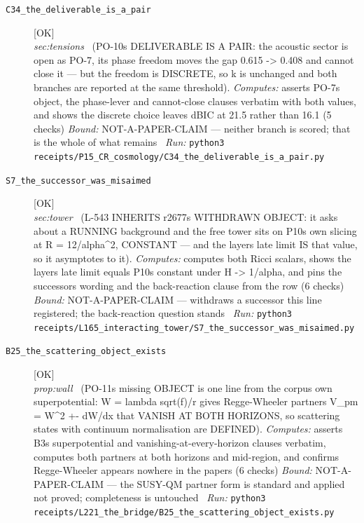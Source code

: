 \begin{description}
\item[\label{rcpt:C34_the_deliverable_is_a_pair}\texttt{C34\_the\_deliverable\_is\_a\_pair}]\hfill\textsf{[OK]}\\
\textit{sec:tensions} \ (PO-10s DELIVERABLE IS A PAIR: the acoustic sector is open as PO-7, its phase freedom moves the gap 0.615 -> 0.408 and cannot close it --- but the freedom is DISCRETE, so k is unchanged and both branches are reported at the same threshold). 
\emph{Computes:} asserts PO-7s object, the phase-lever and cannot-close clauses verbatim with both values, and shows the discrete choice leaves dBIC at 21.5 rather than 16.1 (5 checks)
 \emph{Bound:} NOT-A-PAPER-CLAIM --- neither branch is scored; that is the whole of what remains
\ \emph{Run:} \texttt{python3 receipts/P15\_CR\_cosmology/C34\_the\_deliverable\_is\_a\_pair.py}
\item[\label{rcpt:S7_the_successor_was_misaimed}\texttt{S7\_the\_successor\_was\_misaimed}]\hfill\textsf{[OK]}\\
\textit{sec:tower} \ (L-543 INHERITS r2677s WITHDRAWN OBJECT: it asks about a RUNNING background and the free tower sits on P10s own slicing at R = 12/alpha\textasciicircum{}2, CONSTANT --- and the layers late limit IS that value, so it asymptotes to it). 
\emph{Computes:} computes both Ricci scalars, shows the layers late limit equals P10s constant under H -> 1/alpha, and pins the successors wording and the back-reaction clause from the row (6 checks)
 \emph{Bound:} NOT-A-PAPER-CLAIM --- withdraws a successor this line registered; the back-reaction question stands
\ \emph{Run:} \texttt{python3 receipts/L165\_interacting\_tower/S7\_the\_successor\_was\_misaimed.py}
\item[\label{rcpt:B25_the_scattering_object_exists}\texttt{B25\_the\_scattering\_object\_exists}]\hfill\textsf{[OK]}\\
\textit{prop:wall} \ (PO-11s missing OBJECT is one line from the corpus own superpotential: W = lambda sqrt(f)/r gives Regge-Wheeler partners V\_pm = W\textasciicircum{}2 +- dW/dx that VANISH AT BOTH HORIZONS, so scattering states with continuum normalisation are DEFINED). 
\emph{Computes:} asserts B3s superpotential and vanishing-at-every-horizon clauses verbatim, computes both partners at both horizons and mid-region, and confirms Regge-Wheeler appears nowhere in the papers (6 checks)
 \emph{Bound:} NOT-A-PAPER-CLAIM --- the SUSY-QM partner form is standard and applied not proved; completeness is untouched
\ \emph{Run:} \texttt{python3 receipts/L221\_the\_bridge/B25\_the\_scattering\_object\_exists.py}

\end{description}
